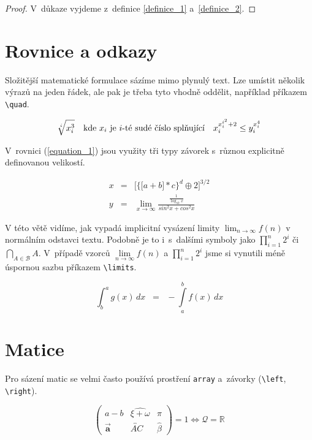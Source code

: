 \documentclass[twocolumn, a4paper, 11pt]{article}
\theoremstyle{definition}
\theoremstyle{plain}
\begin{document}
\begin{proof}
    V~důkaze vyjdeme z~definice \ref{definice_1} a~\ref{definice_2}.
\end{proof}

\section{Rovnice a odkazy}
Složitější matematické formulace sázíme mimo plynulý text.
Lze umístit několik výrazů na jeden řádek,
ale pak je třeba tyto vhodně oddělit, například příkazem \verb|\quad|.

$$
    \sqrt[i]{x_i^3}
    \quad
    \textnormal{kde } x_i \textnormal{ je } i \textnormal{-té sudé číslo splňující}
    \quad
    x_i^{x_i^{i^2}+2} \leq y_i^{x_i^4}
$$

V~rovnici (\ref{equation_1}) jsou využity tři typy závorek s~různou explicitně definovanou velikostí.

\begin{eqnarray}
    \label{equation_1}
    x & = & \bigg[ \Big\{ \big[ a + b \big] * c \Big\}^d \oplus 2 \bigg]^{3/2} \\
    y & = & \lim_{x \to \infty} \frac{ \frac{1}{\log_{10}x} }{ sin^2 x + cos^2 x } \nonumber
\end{eqnarray}

V této větě vidíme, jak vypadá implicitní vysázení limity $ \lim_{n \to \infty} f(n) $ v normálním odstavci textu.
Podobně je to i~s~dalšími symboly jako $ \prod^n_{i = 1} 2^i $ či $ \bigcap_{A \in \mathcal{B}} A $.
V~případě vzorců $ \lim\limits_{n \to \infty} f(n) $ a $ \prod\limits^n_{i = 1} 2^i $ jsme si vynutili méně
úspornou sazbu příkazem \verb|\limits|.

\begin{equation}
    \label{equation_2}
    \int_b^a g(x) \, dx \;\; = \;\; - \int\limits_a^b f(x) \, dx
\end{equation}

\section{Matice}
Pro sázení matic se velmi často používá prostření \verb|array| a~závorky (\verb|\left|, \verb|\right|).

$$
    \left(
    \begin{array}{ccc}
        a - b & \widehat{\xi + \omega} & \pi \\
        \Vec{\mathbf{a}} & \overleftrightarrow{AC} & \hat{\beta}
    \end{array}
    \right)
    = 1 \Longleftrightarrow \mathcal{Q} = \mathbb{R}
$$
\end{document}
